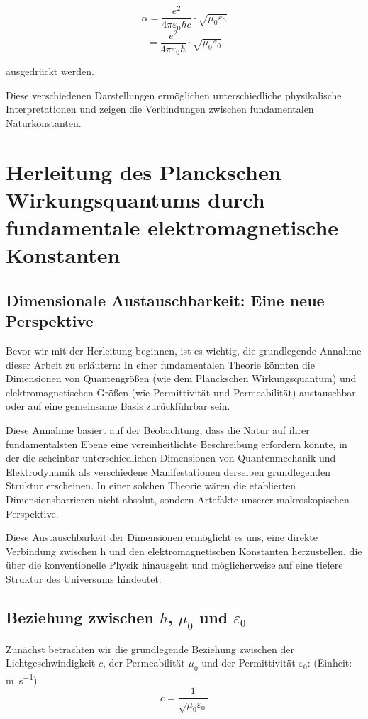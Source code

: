 \documentclass{article}
\begin{document}
	$$\alpha = \frac{e^2}{4\pi\varepsilon_0\hbar c} \cdot \sqrt{\mu_0\varepsilon_0}$$
	$$= \frac{e^2}{4\pi\varepsilon_0\hbar} \cdot \sqrt{\mu_0\varepsilon_0}$$
	
	ausgedrückt werden.
	
	Diese verschiedenen Darstellungen ermöglichen unterschiedliche physikalische Interpretationen und zeigen die Verbindungen zwischen fundamentalen Naturkonstanten.
	

	\section{Herleitung des Planckschen Wirkungsquantums durch fundamentale elektromagnetische Konstanten}
	
	\subsection{Dimensionale Austauschbarkeit: Eine neue Perspektive}
	
	Bevor wir mit der Herleitung beginnen, ist es wichtig, die grundlegende Annahme dieser Arbeit zu erläutern: In einer fundamentalen Theorie könnten die Dimensionen von Quantengrößen (wie dem Planckschen Wirkungsquantum) und elektromagnetischen Größen (wie Permittivität und Permeabilität) austauschbar oder auf eine gemeinsame Basis zurückführbar sein.
	
	Diese Annahme basiert auf der Beobachtung, dass die Natur auf ihrer fundamentalsten Ebene eine vereinheitlichte Beschreibung erfordern könnte, in der die scheinbar unterschiedlichen Dimensionen von Quantenmechanik und Elektrodynamik als verschiedene Manifestationen derselben grundlegenden Struktur erscheinen. In einer solchen Theorie wären die etablierten Dimensionsbarrieren nicht absolut, sondern Artefakte unserer makroskopischen Perspektive.
	
	Diese Austauschbarkeit der Dimensionen ermöglicht es uns, eine direkte Verbindung zwischen h und den elektromagnetischen Konstanten herzustellen, die über die konventionelle Physik hinausgeht und möglicherweise auf eine tiefere Struktur des Universums hindeutet.
	
	\subsection{Beziehung zwischen $h$, $\mu_0$ und $\varepsilon_0$}
	
	Zunächst betrachten wir die grundlegende Beziehung zwischen der Lichtgeschwindigkeit $c$, der Permeabilität $\mu_0$ und der Permittivität $\varepsilon_0$:
 (Einheit: \si{\meter\per\second})	
	$$c = \frac{1}{\sqrt{\mu_0\varepsilon_0}}$$
	
\end{document}
